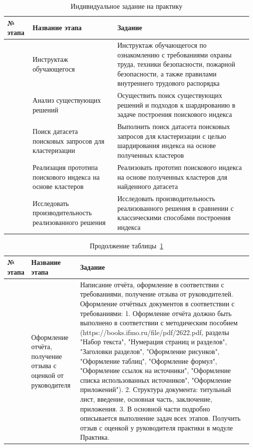 \documentclass[14pt, a4paper]{article}
\begin{document}
	\begin{table}[H]
	\centering
	\caption{Индивидуальное задание на практику}
	\label{tab:individual_task}
	\begin{tabularx}{\textwidth}{|>{\raggedright\arraybackslash}p{0.9cm}|>{\raggedright\arraybackslash}p{3cm}|>{\raggedright\arraybackslash}X|}
	\hline
	\textbf{№ этапа} & \textbf{Название этапа} & \textbf{Задание} \\
	\hline
	1 & Инструктаж обучающегося & Инструктаж обучающегося по ознакомлению с требованиями охраны труда, техники безопасности, пожарной безопасности, а также правилами внутреннего трудового распорядка \\
	\hline
	2 & Анализ существующих решений & Осуществить поиск существующих решений и подходов к шардированию в задаче построения поискового индекса \\
	\hline
	3 & Поиск датасета поисковых запросов для кластеризации & Выполнить поиск датасета поисковых запросов для кластеризации с целью шардирования индекса на основе полученных кластеров \\
	\hline
	4 & Реализация прототипа поискового индекса на основе кластеров & Реализовать прототип поискового индекса на основе полученных кластеров для найденного датасета \\
	\hline
	5 & Исследовать производительность реализованного решения & Исследовать производительность реализованного решения в сравнении с классическими способами построения индекса \\
	\hline
	\end{tabularx}
	\end{table}

	\begin{table}[H]
	\centering
	\caption*{Продолжение таблицы~\ref{tab:individual_task}}
	\begin{tabularx}{\textwidth}{|>{\raggedright\arraybackslash}p{0.9cm}|>{\raggedright\arraybackslash}p{3cm}|>{\raggedright\arraybackslash}X|}
	\hline
	\textbf{№ этапа} & \textbf{Название этапа} & \textbf{Задание} \\
	\hline	
	6 & Оформление отчёта, получение отзыва с оценкой от руководителя & Написание отчёта, оформление в соответствии с требованиями, получение отзыва от руководителей. Оформление отчётных документов в соответствии с требованиями: 1. Оформление отчёта должно быть выполнено в соответствии с методическим пособием (https://books.ifmo.ru/file/pdf/2622.pdf, разделы "Набор текста", "Нумерация страниц и разделов", "Заголовки разделов", "Оформление рисунков", "Оформление таблиц", "Оформление формул", "Оформление ссылок на источники", "Оформление списка использованных источников", "Оформление приложений"). 2. Структура документа: титульный лист, введение, основная часть, заключение, приложения. 3. В основной части подробно описывается выполнение задач всех этапов. Получить отзыв с оценкой у руководителя практики в модуле Практика. \\
	\hline
	\end{tabularx}
	\end{table}
\end{document}
